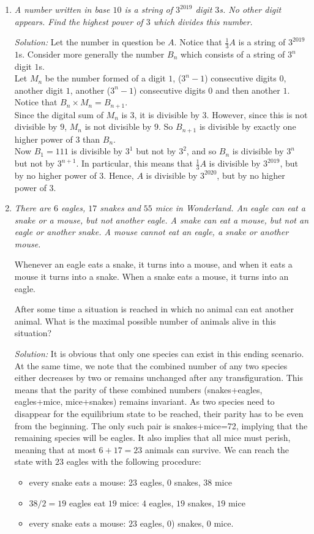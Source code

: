 \documentclass{article}
\begin{document}
\begin{enumerate}[1.]
\item %
{\itshape
A number written in base $10$ is a string of $3^{2019}$ digit $3$s.
No other digit appears.
Find the highest power of $3$ which divides this number.}

\textit{Solution:}
Let the number in question be $A$. Notice that $\frac{1}{3}A$ is a string of $3^{2019}$ $1$s. Consider more generally the number $B_n$ which consists of a string of $3^n$ digit $1$s.\\
Let $M_n$ be the number formed of a digit $1$, ($3^n - 1$) consecutive digits $0$, another digit $1$, another ($3^n - 1$) consecutive digits $0$ and then another $1$.
Notice that $B_n \times M_n = B_{n + 1}$.\\
Since the digital sum of $M_n$ is $3$, it is divisible by $3$. However, since this is not divisible by $9$, $M_n$ is not divisible by $9$. So $B_{n + 1}$ is divisible by exactly one higher power of $3$ than $B_n$.\\
Now $B_1 = 111$ is divisible by $3^1$ but not by $3^2$, and so $B_n$ is divisible by $3^n$ but not by $3^{n + 1}$. In particular, this means that $\frac{1}{3}A$ is divisible by $3^{2019}$, but by no higher power of $3$. Hence, $A$ is divisible by $3^{2020}$, but by no higher power of $3$.


\item %
{\itshape
There are $6$ eagles, $17$ snakes and $55$ mice in Wonderland.
An eagle can eat a snake or a mouse, but not another eagle.
A snake can eat a mouse, but not an eagle or another snake.
A mouse cannot eat an eagle, a snake or another mouse.

Whenever an eagle eats a snake, it turns into a mouse, and when it eats a mouse it turns into a snake. When a snake eats a mouse, it turns into an eagle.

After some time a situation is reached in which no animal can eat another animal.
What is the maximal possible number of animals alive in this situation?}

\textit{Solution:}
It is obvious that only one species can exist in this ending scenario. At the same time, we note that the combined number of any two species either decreases by two or remains unchanged after any transfiguration. This means that the parity of these combined numbers (snakes+eagles, eagles+mice, mice+snakes) remains invariant.
As two species need to disappear for the equilibrium state to be reached, their parity has to be even from the beginning. The only such pair is snakes+mice=72, implying that the remaining species will be eagles.
It also implies that all mice must perish, meaning that at most $6+17=23$ animals can survive. We can reach the state with $23$ eagles with the following procedure:
\begin{itemize}
  \item every snake eats a mouse: 23 eagles, 0 snakes, 38 mice
  \item $38/2=19$ eagles eat $19$ mice: $4$ eagles, $19$ snakes, $19$ mice
  \item every snake eats a mouse: $23$ eagles, $0$) snakes, $0$ mice.
\end{itemize}



\end{enumerate}
\end{document}
